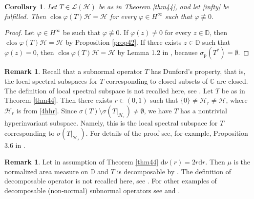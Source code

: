 \documentclass[a4paper,oneside,11pt]{amsart}
\numberwithin{equation}{section}
\theoremstyle{plain}
\newtheorem{corollary}[theorem]{Corollary}
\theoremstyle{definition}
\newtheorem{remark}[theorem]{Remark}
\begin{document}
\begin{corollary} \label{cor44} Let $T\in\mathcal L(\mathcal H)$ be as in Theorem \ref{thm44}, and let \eqref{infty}
be fulfilled. Then $\operatorname{clos}\varphi(T)\mathcal H=\mathcal H$ for every
 $\varphi\in H^\infty$ such that $\varphi\not\equiv 0$. 
\end{corollary}

\begin{proof} Let $\varphi\in H^\infty$ be  such that $\varphi\not\equiv 0$. If $\varphi(z)\neq 0$ for every
 $z\in\mathbb D$, then $\operatorname{clos}\varphi(T)\mathcal H=\mathcal H$ by  Proposition \ref{prop42}. 
If there exists  $z\in\mathbb D$ such that  $\varphi(z)=0$, then  $\operatorname{clos}\varphi(T)\mathcal H=\mathcal H$ by Lemma 1.2 in \cite{g19}, because $\sigma_{\mathrm{p}}(T^*)=\emptyset$. 
\end{proof}


\begin{remark} Recall that a subnormal operator $T$ has Dunford's property, that is, the local spectral subspaces 
 for $T$ corresponding to closed subsets of $\mathbb C$ are closed. The definition of  local spectral subspace 
is not recalled here, see \cite{laursenneumann}. 
 Let $T$ be as in Theorem \ref{thm44}. Then there exists $r\in(0,1)$ such that 
$\{0\}\neq\mathcal H_r\neq\mathcal H$, where $\mathcal H_r$ is from \eqref{4hhr}. 
Since $\sigma(T)\setminus\sigma(T|_{\mathcal H_r})\neq\emptyset$, we have $T$ has a nontrivial 
hyperinvariant subspace.  Namely, this is the local spectral subspace for $T$ corresponding to 
$\sigma(T|_{\mathcal H_r})$. For details of the proof see, for example, Proposition 3.6 in \cite{jungko}. 
\end{remark}

\begin{remark} Let in assumption of Theorem \ref{thm44} $\mathrm{d}\nu(r)=2r\mathrm{d}r$. 
Then $\mu$ is the normalized area measure on $\mathbb D$ and $T$ is decomposable by \cite{afv}.  
The definition of decomposable operator is not recalled here, see \cite{laursenneumann}. 
For other examples of decomposable (non-normal) subnormal operators see \cite{albr} and \cite{radj}. 
\end{remark}
\end{document}
